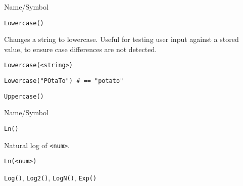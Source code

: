 \rl


\begin{desc}{Name/Symbol}
\item[Name/Symbol]	\verb+Lowercase()+

\item[Description]	Changes a string to lowercase.  Useful for testing user
		input against a stored value, to ensure case differences
		are not detected.

\item[Usage]
\begin{verbatim}
Lowercase(<string>)
\end{verbatim}

\item[Example]
\begin{verbatim}
Lowercase("POtaTo")	# == "potato"
\end{verbatim}

\item[See Also]	\verb+Uppercase()+
\end{desc}

\rl


\begin{desc}{Name/Symbol}
\item[Name/Symbol]	\verb+Ln()+

\item[Description]	Natural log of \verb+<num>+.

\item[Usage]		
\begin{verbatim}
Ln(<num>)
\end{verbatim}

\item[Example]	

\item[See Also]	\verb+Log()+, \verb+Log2()+, \verb+LogN()+, \verb+Exp()+     
\end{desc}

\rl






